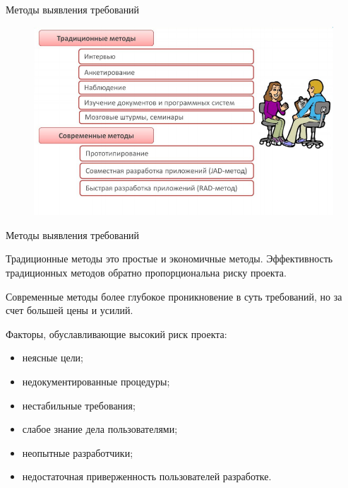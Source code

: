 \documentclass{beamer}
\begin{document}
\begin{frame}[t]{Методы выявления требований}
\begin{figure}[h]
\centering
\includegraphics[scale=0.5]{images/lec02-pic08.png}
\end{figure}
\end{frame}

\begin{frame}[t]{Методы выявления требований}
\begin{block}{Традиционные методы}
это простые и экономичные методы. Эффективность традиционных методов обратно пропорциональна риску
проекта.
\end{block}
\begin{block}{Современные методы}
более глубокое проникновение в суть требований, но за счет большей цены и усилий.
\end{block}
Факторы, обуславливающие высокий риск проекта:
\begin{itemize}
\item неясные цели; 
\item недокументированные процедуры;
\item нестабильные требования; 
\item слабое знание дела пользователями; 
\item неопытные разработчики; 
\item недостаточная приверженность пользователей разработке.
\end{itemize}
\end{frame}
\end{document}
